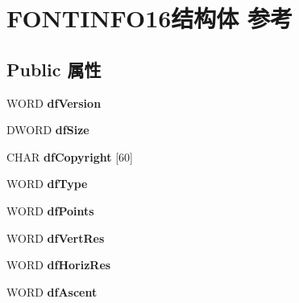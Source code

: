 \hypertarget{struct_f_o_n_t_i_n_f_o16}{}\section{F\+O\+N\+T\+I\+N\+F\+O16结构体 参考}
\label{struct_f_o_n_t_i_n_f_o16}
\subsection*{Public 属性}
\begin{DoxyCompactItemize}
\item 
\mbox{\label{struct_f_o_n_t_i_n_f_o16_af016242e47ba89622b0827de26ec9139}} 
W\+O\+RD {\bfseries df\+Version}
\item 
\mbox{\label{struct_f_o_n_t_i_n_f_o16_af36f13b0b70b576f24122744486f9f23}} 
D\+W\+O\+RD {\bfseries df\+Size}
\item 
\mbox{\label{struct_f_o_n_t_i_n_f_o16_a8a451a9a0e5ae0b5d7c16cf0347d9ff6}} 
C\+H\+AR {\bfseries df\+Copyright} \mbox{[}60\mbox{]}
\item 
\mbox{\label{struct_f_o_n_t_i_n_f_o16_ae99bf95e0903d3c3d4fed503de8e1adb}} 
W\+O\+RD {\bfseries df\+Type}
\item 
\mbox{\label{struct_f_o_n_t_i_n_f_o16_a1cb5fd474ca5d789f8f53ee26935ef4a}} 
W\+O\+RD {\bfseries df\+Points}
\item 
\mbox{\label{struct_f_o_n_t_i_n_f_o16_a88ffc35e8f784c36f7dd015ef0c8480a}} 
W\+O\+RD {\bfseries df\+Vert\+Res}
\item 
\mbox{\label{struct_f_o_n_t_i_n_f_o16_ae6766e0e41f0702878991ff585f9be4e}} 
W\+O\+RD {\bfseries df\+Horiz\+Res}
\item 
\mbox{\label{struct_f_o_n_t_i_n_f_o16_ab840ced141585e129994b9db7e6037c4}} 
W\+O\+RD {\bfseries df\+Ascent}
\item 
\mbox{\label{struct_f_o_n_t_i_n_f_o16_a35dbc14626608dc22b6a23a0ec7297a0}} 

\end{DoxyCompactItemize}
